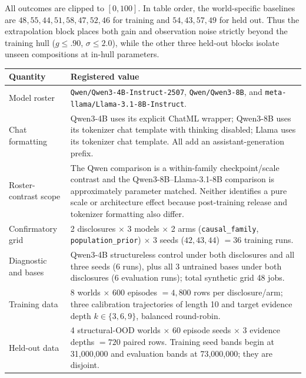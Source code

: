 All outcomes are clipped to $[0,100]$. In table order, the world-specific
baselines are $48,55,44,51,58,47,52,46$ for training and $54,43,57,49$ for
held out. Thus the extrapolation block places both gain and observation noise
strictly beyond the training hull ($g\leq .90$, $\sigma\leq2.0$), while the
other three held-out blocks isolate unseen compositions at in-hull parameters.
\begin{center}
\begin{minipage}{\linewidth}
\centering
{}
\label{tab:exp3-expanded-hparams}
\scriptsize
\setlength{\tabcolsep}{3pt}
\begin{tabular}{p{.29\linewidth}p{.66\linewidth}}
\toprule
\textbf{Quantity} & \textbf{Registered value} \\
\midrule
Model roster & \texttt{Qwen/Qwen3-4B-Instruct-2507},
\texttt{Qwen/Qwen3-8B}, and \texttt{meta-llama/Llama-3.1-8B-Instruct}. \\
Chat formatting & Qwen3-4B uses its explicit ChatML wrapper; Qwen3-8B uses its
tokenizer chat template with thinking disabled; Llama uses its tokenizer chat
template.  All add an assistant-generation prefix. \\
Roster-contrast scope & The Qwen comparison is a within-family
checkpoint/scale contrast and the Qwen3-8B--Llama-3.1-8B comparison is
approximately parameter matched.  Neither identifies a pure scale or architecture
effect because post-training release and tokenizer formatting also differ. \\
Confirmatory grid & 2 disclosures $\times$ 3 models $\times$ 2 arms
(\texttt{causal\_family}, \texttt{population\_prior}) $\times$ 3 seeds
($42,43,44$) $=36$ training runs. \\
Diagnostic and bases & Qwen3-4B structureless control under both disclosures and
all three seeds (6 runs), plus all 3 untrained bases under both disclosures (6
evaluation runs); total synthetic grid 48 jobs. \\
Training data & 8 worlds $\times$ 600 episodes $=4,800$ rows per disclosure/arm;
three calibration trajectories of length 10 and target evidence depth
$k\in\{3,6,9\}$, balanced round-robin. \\
Held-out data & 4 structural-OOD worlds $\times$ 60 episode seeds $\times$ 3 evidence
depths $=720$ paired rows.  Training seed bands begin at 31,000,000 and evaluation
bands at 73,000,000; they are disjoint. \\

\end{tabular}
\end{minipage}
\end{center}

